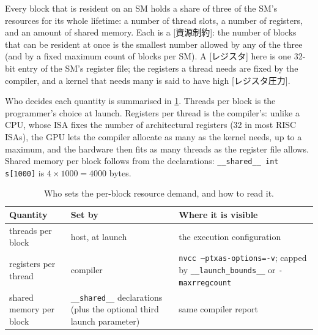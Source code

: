 \documentclass[../main.tex]{subfiles}
\begin{document}
\begin{definition}
  Every block that is resident on an SM holds a share of three of the
  SM's resources for its whole lifetime: a number of thread slots, a
  number of registers, and an amount of shared memory.  Each is a
  [資源制約]: the number of blocks that can be
  resident at once is the smallest number allowed by any of the three
  (and by a fixed maximum count of blocks per SM).  A
  [レジスタ] here is one 32-bit entry of the SM's register
  file; the registers a thread needs are fixed by the compiler, and a
  kernel that needs many is said to have high
  [レジスタ圧力].
\end{definition}

Who decides each quantity is summarised in
\cref{tab:l03-who-sets}.  Threads per block is the programmer's choice at
launch.  Registers per thread is the compiler's: unlike a CPU, whose ISA
fixes the number of architectural registers (32 in most RISC ISAs), the
GPU lets the compiler allocate as many as the kernel needs, up to a
maximum, and the hardware then fits as many threads as the register file
allows.  Shared memory per block follows from the declarations:
\texttt{\_\_shared\_\_ int s[1000]} is $4 \times 1000 = 4000$ bytes.

\begin{table}[tb]
  \centering
  \small
  \caption{Who sets the per-block resource demand, and how to read it.}
  \label{tab:l03-who-sets}
  \begin{tabular}{>{\raggedright\arraybackslash}p{28mm}
                  >{\raggedright\arraybackslash}p{24mm}
                  >{\raggedright\arraybackslash}p{50mm}}
    \toprule
    Quantity & Set by & Where it is visible \\
    \midrule
    threads per block & host, at launch & the execution configuration \\
    registers per thread & compiler & \texttt{nvcc --ptxas-options=-v}; capped by \texttt{\_\_launch\_bounds\_\_} or \texttt{-maxrregcount} \\
    shared memory per block & \texttt{\_\_shared\_\_} declarations (plus the optional third launch parameter) & same compiler report \\
    \bottomrule
  \end{tabular}
\end{table}
\end{document}
